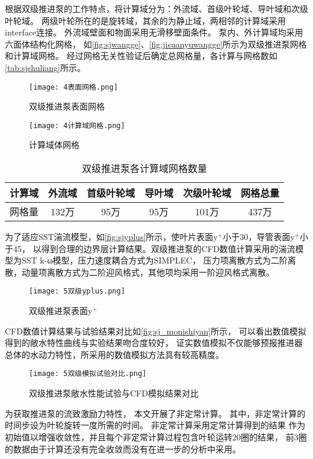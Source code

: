 根据双级推进泵的工作特点，将计算域分为：外流域、首级叶轮域、导叶域和次级叶轮域。
两级叶轮所在的是旋转域，其余的为静止域，两相邻的计算域采用interface连接。
外流域壁面和物面采用无滑移壁面条件。
泵内、外计算域均采用六面体结构化网格，
如\autoref{fig:sjwangge}、\autoref{fig:jisuanyuwangge}所示为双级推进泵网格和计算域网格。
经过网格无关性验证后确定总网格量，各计算与网格数如\autoref{tab:sjshuliang}所示。
\begin{figure}[htbp]
    \centering
    \texttt{[image: 4表面网格.png]}
    \caption{\label{fig:sjwangge}双级推进泵表面网格}
\end{figure}
\begin{figure}[htbp]
    \centering
    \texttt{[image: 4计算域网格.png]}
    \caption{\label{fig:jisuanyuwangge}计算域体网格}
\end{figure}
\begin{table}[htbp]
    \centering
    \caption{\label{tab:sjshuliang}双级推进泵各计算域网格数量}
    \begin{tabular}{cccccc}
        \toprule
        计算域 & 外流域 & 首级叶轮域 & 导叶域 & 次级叶轮域 & 网格总量 \\
        \midrule
        网格量 & 132万 & 95万 & 95万 & 101万 & 437万 \\
        \bottomrule
    \end{tabular}
\end{table}

为了适应SST湍流模型，如\autoref{fig:sjyplus}所示，使叶片表面y$^+$小于30，导管表面y$^+$小于45，
以得到合理的边界层计算结果。双级推进泵的CFD数值计算采用的湍流模型为SST k-ω模型，压力速度耦合方式为SIMPLEC，
压力项离散方式为二阶离散，动量项离散方式为二阶迎风格式，其他项均采用一阶迎风格式离散。
\begin{figure}[htbp]
    \centering
    \texttt{[image: 5双级yplus.png]}
    \caption{\label{fig:sjyplus}双级推进泵表面y$^+$}
\end{figure}

CFD数值计算结果与试验结果对比如\autoref{fig:sj_monishiyan}所示，
可以看出数值模拟得到的敞水特性曲线与实验结果吻合度较好，
证实数值模拟不仅能够预报推进器总体的水动力特性，所采用的数值模拟方法具有较高精度。
\begin{figure}[htbp]
    \centering
    \texttt{[image: 5双级模拟试验对比.png]}
    \caption{\label{fig:sj_monishiyan}双级推进泵敞水性能试验与CFD模拟结果对比}
\end{figure}

为获取推进泵的流致激励力特性，
本文开展了非定常计算。
其中，非定常计算的时间步设为叶轮旋转一度所需的时间。
非定常计算采用定常计算得到的结果
作为初始值以增强收敛性，并且每个非定常计算过程包含叶轮运转20圈的结果，
前3圈的数据由于计算还没有完全收敛而没有在进一步的分析中采用。
